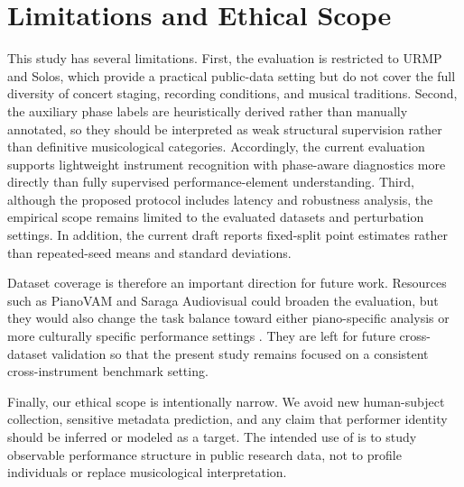\section{Limitations and Ethical Scope}
\label{sec:limitations}

This study has several limitations. First, the evaluation is restricted to URMP and Solos, which provide a practical public-data setting but do not cover the full diversity of concert staging, recording conditions, and musical traditions. Second, the auxiliary phase labels are heuristically derived rather than manually annotated, so they should be interpreted as weak structural supervision rather than definitive musicological categories. Accordingly, the current evaluation supports lightweight instrument recognition with phase-aware diagnostics more directly than fully supervised performance-element understanding. Third, although the proposed protocol includes latency and robustness analysis, the empirical scope remains limited to the evaluated datasets and perturbation settings. In addition, the current draft reports fixed-split point estimates rather than repeated-seed means and standard deviations.

Dataset coverage is therefore an important direction for future work. Resources such as PianoVAM and Saraga Audiovisual could broaden the evaluation, but they would also change the task balance toward either piano-specific analysis or more culturally specific performance settings \citep{Kim2025PianoVAM,Shankar2024SaragaAV}. They are left for future cross-dataset validation so that the present study remains focused on a consistent cross-instrument benchmark setting.

Finally, our ethical scope is intentionally narrow. We avoid new human-subject collection, sensitive metadata prediction, and any claim that performer identity should be inferred or modeled as a target. The intended use of \method{} is to study observable performance structure in public research data, not to profile individuals or replace musicological interpretation.
